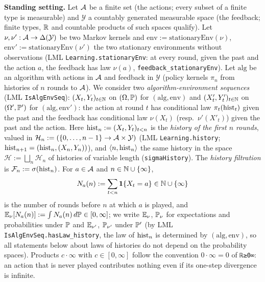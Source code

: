 \textbf{Standing setting.} Let $\mathcal{A}$ be a finite set (the actions; every subset of a finite
type is measurable) and $\mathcal Y$ a countably generated measurable space (the feedback;
finite types, $\mathbb{R}$ and countable products of such spaces qualify). Let $\nu, \nu' : \mathcal{A} \to
\Delta(\mathcal Y)$ be two Markov kernels and $\mathrm{env} := \mathrm{stationaryEnv}(\nu)$,
$\mathrm{env}' := \mathrm{stationaryEnv}(\nu')$ the two stationary environments without
observations (LML \texttt{Learning.stationaryEnv}: at every round, given the past and the
action $a$, the feedback has law $\nu(a)$, \texttt{feedback\_stationaryEnv}). Let
$\mathrm{alg}$ be an algorithm with actions in $\mathcal{A}$ and feedback in $\mathcal Y$ (policy
kernels $\pi_n$ from histories of $n$ rounds to $\mathcal{A}$). We consider two
\emph{algorithm-environment sequences} (LML \texttt{IsAlgEnvSeq}): $(X_t, Y_t)_{t \in \mathbb{N}}$ on
$(\Omega, \mathbb{P})$ for $(\mathrm{alg}, \mathrm{env})$ and $(X'_t, Y'_t)_{t\in\mathbb{N}}$ on
$(\Omega', \mathbb{P}')$ for $(\mathrm{alg}, \mathrm{env}')$: the action at round $t$ has
conditional law $\pi_t(\mathrm{hist}_t)$ given the past and the feedback has conditional law
$\nu(X_t)$ (resp.\ $\nu'(X'_t)$) given the past and the action. Here
$\mathrm{hist}_n := (X_t, Y_t)_{t < n}$ is the \emph{history of the first $n$ rounds}, valued in
$\mathcal H_n := (\{0, \dots, n-1\} \to \mathcal{A} \times \mathcal Y)$ (LML \texttt{Learning.history};
$\mathrm{hist}_{n+1} = (\mathrm{hist}_n, (X_n, Y_n))$), and $\langle n, \mathrm{hist}_n\rangle$ the same history in the
space $\mathcal H := \bigsqcup_n \mathcal H_n$ of histories of variable length
(\texttt{sigmaHistory}). The \emph{history filtration} is $\mathcal F_n := \sigma(\mathrm{hist}_n)$.
For $a \in \mathcal{A}$ and $n \in \mathbb{N} \cup \{\infty\}$,
\[
  N_a(n) := \sum_{t < n} \mathbf{1}\{X_t = a\} \in \mathbb{N} \cup \{\infty\}
\]
is the number of rounds before $n$ at which $a$ is played, and $\mathbb{E}_\nu[N_a(n)] := \int N_a(n)\,d\mathbb{P}
\in [0, \infty]$; we write $\mathbb{E}_\nu$, $\mathbb{P}_\nu$ for expectations and probabilities under
$\mathbb{P}$ and $\mathbb{E}_{\nu'}$, $\mathbb{P}_{\nu'}$ under $\mathbb{P}'$ (by LML
\texttt{IsAlgEnvSeq.hasLaw\_history}, the law of $\mathrm{hist}_n$ is determined by $(\mathrm{alg},
\mathrm{env})$, so all statements below about laws of histories do not depend on the
probability spaces). Products $c \cdot \infty$ with $c \in [0,\infty]$ follow the convention
$0 \cdot \infty = 0$ of \texttt{ℝ≥0∞}: an action that is never played contributes nothing even
if its one-step divergence is infinite.

